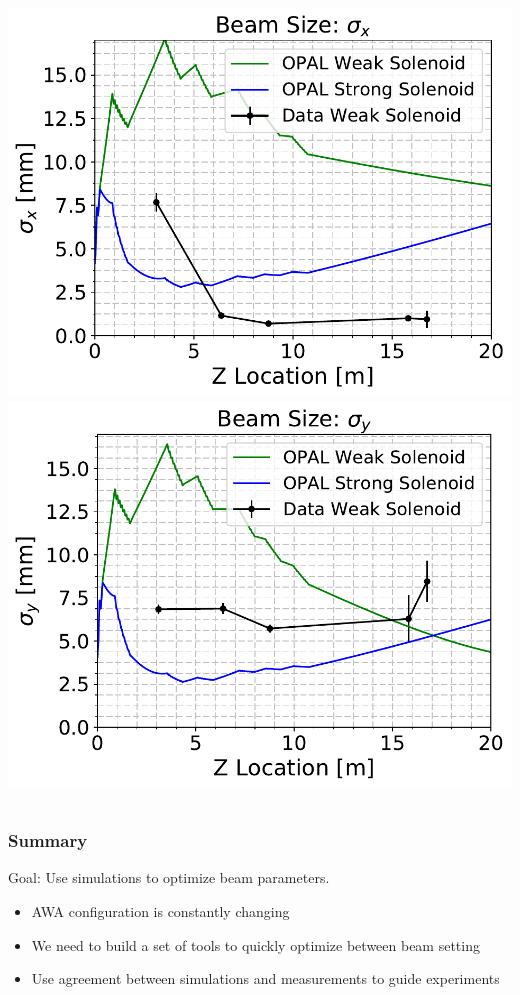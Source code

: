 \documentclass[professionalfonts,t]{beamer}
\begin{document}
\begin{frame}
\begin{columns}[T]
\begin{column}{.5\textwidth}
		\includegraphics[width=0.75\linewidth]{../images/beamsizes_3Dx} \\ \vspace{0.25em}
		\includegraphics[width=0.75\linewidth]{../images/beamsizes_3Dy}
	\end{column}%
\end{columns}
\end{frame}
\begin{frame}
	\frametitle{Summary}
	Goal: Use simulations to optimize beam parameters. 
	\begin{itemize}		
		\item AWA configuration is constantly changing
		\item We need to build a set of tools to quickly optimize between beam setting
		\item Use agreement between simulations and measurements to guide experiments
	
	\end{itemize}
\end{frame}
\end{document}
